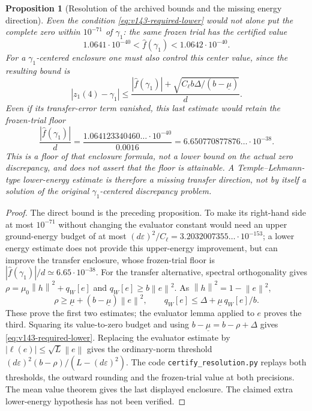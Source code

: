 \documentclass[11pt]{article}
\newtheorem{proposition}[theorem]{Proposition}
\theoremstyle{remark}
\newcommand{\norm}[1]{\left\lVert #1\right\rVert}
\begin{document}
\begin{proposition}[Resolution of the archived bounds and the missing energy direction]
Even the condition \eqref{eq:v143-required-lower} would not alone
put the complete zero within $10^{-71}$ of $\gamma_1$: the same
frozen trial has the certified value
\[
 1.0641\cdot10^{-40}<\widehat f(\gamma_1)<1.0642\cdot10^{-40}.
\]
For a $\gamma_1$-centered enclosure one must also control this center
value, since the resulting bound is
\[
 |z_1(4)-\gamma_1|\le
 \frac{|\widehat f(\gamma_1)|+
       \sqrt{C_\ell b\Delta/(b-\underline\mu)}}d.
\]
Even if its transfer-error term vanished, this last estimate would
retain the frozen-trial floor
\[
 \frac{|\widehat f(\gamma_1)|}{d}
 =\frac{1.064123340460\ldots\cdot10^{-40}}{0.0016}
 =6.650770877876\ldots\cdot10^{-38}.
\]
This is a floor of that enclosure formula, not a lower bound on the
actual zero discrepancy, and does not assert that the floor is attainable.
A Temple--Lehmann-type lower-energy estimate is therefore a missing
\emph{transfer} direction, not by itself a solution of the original
$\gamma_1$-centered discrepancy problem.
\end{proposition}
\begin{proof}
The direct bound is the preceding proposition. To make its right-hand
side at most $10^{-71}$ without changing the evaluator constant would
need an upper ground-energy budget of at most
$(d\varepsilon)^2/C_\ell=3.2032007355\ldots\cdot10^{-153}$;
a lower energy estimate does not provide this upper-energy improvement,
but can improve the transfer enclosure, whose frozen-trial floor is
$|\widehat f(\gamma_1)|/d\simeq6.65\cdot10^{-38}$.
For the transfer alternative, spectral orthogonality gives
$\rho=\mu_0\norm h^2+q_W[e]$ and $q_W[e]\ge b\norm e^2$.
As $\norm h^2=1-\norm e^2$,
\[
 \rho\ge\underline\mu+(b-\underline\mu)\norm e^2,
 \qquad
 q_W[e]\le\Delta+\underline\mu\,q_W[e]/b.
\]
These prove the first two estimates; the evaluator lemma applied to $e$
proves the third. Squaring its value-to-zero budget and using
$b-\underline\mu=b-\rho+\Delta$ gives
\eqref{eq:v143-required-lower}. Replacing the evaluator estimate by
$|\ell(e)|\le\sqrt L\norm e$ gives the ordinary-norm threshold
$(d\varepsilon)^2(b-\rho)/(L-(d\varepsilon)^2)$.
The code \texttt{certify\_resolution.py} replays both thresholds,
the outward rounding and the frozen-trial value at both precisions.
The mean value theorem gives the last displayed enclosure. The
claimed extra lower-energy hypothesis has not been verified.
\end{proof}
\end{document}
